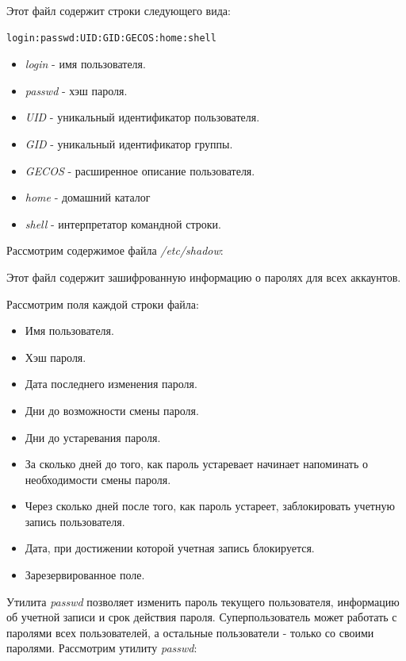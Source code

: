 \documentclass[14pt,a4paper,report]{report}
\begin{document}


Этот файл содержит строки следующего вида:

\begin{verbatim}
login:passwd:UID:GID:GECOS:home:shell
\end{verbatim}

\begin{itemize}
	\item \emph{login} - имя пользователя.
	\item \emph{passwd} - хэш пароля.
	\item \emph{UID} - уникальный идентификатор пользователя.
	\item \emph{GID} - уникальный идентификатор группы.
	\item \emph{GECOS} - расширенное описание пользователя.
	\item \emph{home} - домашний каталог
	\item \emph{shell} - интерпретатор командной строки.
\end{itemize}

Рассмотрим содержимое файла \emph{/etc/shadow}:



Этот файл содержит зашифрованную информацию о паролях для всех аккаунтов.

Рассмотрим поля каждой строки файла:

\begin{itemize}
	\item Имя пользователя.
	\item Хэш пароля.
	\item Дата последнего изменения пароля.
	\item Дни до возможности смены пароля.
	\item Дни до устаревания пароля.
	\item За сколько дней до того, как пароль устаревает начинает напоминать о необходимости смены пароля.
	\item Через сколько дней после того, как пароль устареет, заблокировать учетную запись пользователя.
	\item Дата, при достижении которой учетная запись блокируется.
	\item Зарезервированное поле.
\end{itemize}

Утилита \emph{passwd} позволяет изменить пароль текущего пользователя, информацию об учетной записи и срок действия пароля. Суперпользователь может работать с паролями всех пользователей, а остальные пользователи - только со своими паролями. Рассмотрим утилиту \emph{passwd}:
\end{document}
